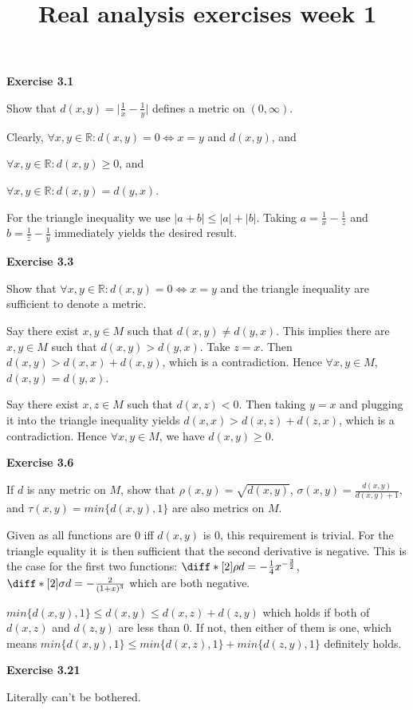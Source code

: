 \documentclass{article}
\newenvironment{myindentpar}[1]%
 {\begin{list}{}%
         {\setlength{\leftmargin}{#1}}%
         \item[]%
 }
 {\end{list}}
\begin{document}
\title{Real analysis exercises week 1} \maketitle


\textbf{Exercise 3.1}
\begin{myindentpar}{1cm}
Show that $d(x, y)=\lvert \frac{1}{x} - \frac{1}{y}\rvert$ defines a metric on $(0,\infty)$.

	Clearly, $\forall x, y \in \mathbb{R}: d(x, y)=0\iff x=y$ and $d(x, y)$, and

	$\forall x, y \in \mathbb{R}: d(x, y) \geq 0$, and

	$\forall x, y \in \mathbb{R}: d(x, y) = d(y, x)$.

	For the triangle inequality we use $\lvert a + b\rvert \leq \lvert a \rvert + \lvert b \rvert$.
	Taking $a = \frac{1}{x} - \frac{1}{z}$ and $b = \frac{1}{z} - \frac{1}{y}$ immediately yields the desired result.

\end{myindentpar}

\textbf{Exercise 3.3}
\begin{myindentpar}{1cm}
	Show that $\forall x, y \in \mathbb{R}: d(x, y)=0 \iff x=y$ and the triangle inequality are sufficient to denote a metric.

	Say there exist $x, y \in M$ such that $d(x, y)\neq d(y,x)$. This implies there are $x, y \in M$ such that $d(x,y) > d(y,x)$.
	Take $z=x$. Then $d(x,y) > d(x,x) + d(x,y)$, which is a contradiction. Hence $\forall x, y \in M$, $d(x,y)=d(y,x)$.

	Say there exist $x, z \in M$ such that $d(x,z) < 0$. Then taking $y=x$ and plugging it into the triangle inequality yields  $d(x,x) > d(x,z) + d(z,x)$,
	which is a contradiction. Hence $\forall x, y \in M$, we have $d(x,y) \geq 0$.

\end{myindentpar}

\textbf{Exercise 3.6}
\begin{myindentpar}{1cm}

	If $d$ is any metric on $M$, show that $\rho(x, y)=\sqrt{d(x,y)}$, $\sigma(x, y)=\frac{d(x, y)}{d(x, y) + 1}$, and $\tau(x, y)=min\{d(x,y), 1\}$ are also metrics on $M$.

	Given as all functions are $0$ iff $d(x,y)$ is $0$, this requirement is trivial. For the triangle equality it is then sufficient that the second derivative is negative.
	This is the case for the first two functions: $\diff*[2]{\rho}{d}=-\frac{1}{4}x^{-\frac{3}{2}}$, $\diff*[2]{\sigma}{d}=-\frac{2}{(1+x)^3}$ which are both negative.

	$min\{d(x,y), 1\}\leq d(x,y) \leq d(x,z) + d(z, y)$ which holds if both of $d(x,z)$ and $d(z,y)$ are less than $0$. If not, then either of them is one, which means
	$min\{d(x,y), 1\}\leq min\{d(x, z), 1\} + min\{d(z, y), 1\}$ definitely holds.

\end{myindentpar}

\textbf{Exercise 3.21}

Literally can't be bothered.
\end{document}
